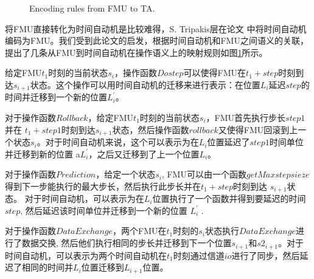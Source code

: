 \begin{figure}[htbp]
	\caption{Encoding rules from FMU to TA.}
	\label{fmutota}
\end{figure}

将FMU直接转化为时间自动机是比较难得，S. Tripakis层在论文 \cite{Tripakis15}中将时间自动机编码为FMU。我们受到此论文的启发，根据时间自动机和FMU之间语义的关联，提出了几条从FMU到时间自动机在操作语义上的映射规则如图\ref{fmutota}所示。

给定FMU$t_{1}$时刻的当前状态$s_{i}$，操作函数$Dostep$可以使得FMU在$t_{1}+step$时刻到达$s_{i+1}$状态。这个操作可以用时间自动机的迁移来进行表示：在位置$L_{i}$延迟$step$的时间并迁移到一个新的位置$L_{i}^{\prime}$。

对于操作函数$Rollback$，给定FMU$t_{1}$时刻的当前状态$s_{i}$，FMU首先执行步长$step1$并在 $t_{1}+step1$时刻到达$s_{i+1}$状态，然后操作函数$rollback$又使得FMU回滚到上一个状态$s_{i}$。对于时间自动机来说，这个可以表示为在$L_{i}$位置延迟了$step1$时间单位并迁移到新的位置 a$L_{i}^{\prime}$，之后又迁移到了上一个位置$L_{i}$。 

对于操作函数$Prediction$，给定一个状态$s_{i}$, FMU可以由一个函数$getMaxstepsieze$得到下一步能执行的最大步长，然后执行此步长并在$t_{1}+step$时刻到达 $s_{i+1}$状态。 对于时间自动机，可以表示为在$L_{i}$位置执行了一个函数并得到要延迟的时间 $step$, 然后延迟该时间单位并迁移到一个新的位置 $L_{i}^{\prime}$ .

对于操作函数$Data Exchange$，两个FMU在$t_{1}$时刻的$s_{i}$状态执行$Data Exchange$进行了数据交换, 然后他们执行相同的步长并迁移到下一个位置$s_{i+1}$和$s2_{i+1}$。对于时间自动机，可以表示为两个时间自动机在$t_{1}$时刻通过信道$io$进行了同步，然后延迟了相同的时间并$L_{i}$位置迁移到$L_{i+1}$位置。

